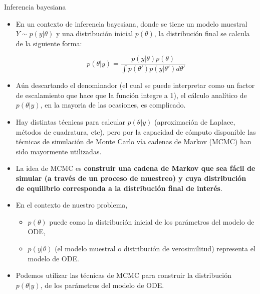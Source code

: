 \documentclass[11pt]{beamer}
\begin{document}
\begin{frame}{Inferencia bayesiana}
	\begin{itemize}
		\item En un contexto de inferencia bayesiana, donde se tiene un modelo muestral $Y \sim p(y|\theta)$ y una distribución inicial $p(\theta)$, la distribución final se calcula de la siguiente forma:
		
		 \begin{equation*}
		 	p(\theta | y) =  \dfrac{p(y | \theta)p(\theta)}{\int p(\theta{'}) p(y|\theta{'})d\theta{'}}
		 \end{equation*} 
		\item Aún descartando el denominador (el cual se puede interpretar como un factor de escalamiento que hace que la función integre a 1), el cálculo analítico de $p(\theta | y) $, en la mayoria de las ocasiones, es complicado.
	\end{itemize}
	
\end{frame}


\begin{frame}\small
	\begin{itemize}
		\item Hay distintas técnicas para calcular $p(\theta | y) $ (aproximación de Laplace, métodos de cuadratura, etc), pero por la capacidad de cómputo disponible las técnicas de simulación de Monte Carlo vía cadenas de Markov (MCMC) han sido mayormente utilizadas.
		\item La idea de MCMC es \textbf{construir una cadena de Markov que sea fácil de simular (a través de un proceso de muestreo) y cuya distribución de equilibrio corresponda a la distribución final de interés}.
	\end{itemize}
\end{frame}

\begin{frame}
	\begin{itemize}
		\item En el contexto de nuestro problema,
		\begin{itemize}
			\item $p(\theta)$ puede como la distribución inicial de los parámetros del modelo de ODE, 
			\item $p(y|\theta)$ (el modelo muestral o distribución de verosimilitud) representa el modelo de ODE. 
		\end{itemize}	
		
		\item Podemos utilizar las técnicas de MCMC para construir la distribución $p(\theta|y)$, de los parámetros del modelo de ODE.  
	\end{itemize}
\end{frame}
\end{document}
